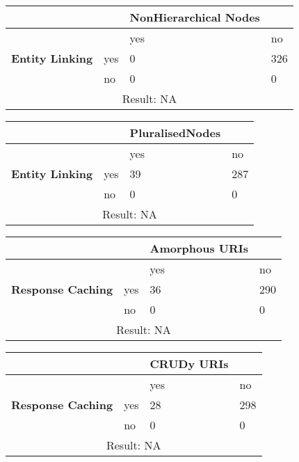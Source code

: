 \documentclass[a4paper,12pt]{article}
\begin{document}
\begin{center}
  \begin{tabular}{| p{60mm} | p{10mm} | p{35mm} | p{35mm} |}
  \hline
   & & \textbf{NonHierarchical Nodes} &
  \\
  \hline
  & & yes & no
  \\
  \hline
  \textbf{Entity Linking} & yes & 0 & 326
  \\
  \hline
   & no & 0 & 0
  \\
  \hline
  \multicolumn{4}{|c|}{Result: NA}
  \\ \hline
  \end{tabular}
  \end{center}

\begin{center}
  \begin{tabular}{| p{60mm} | p{10mm} | p{35mm} | p{35mm} |}
  \hline
   & & \textbf{PluralisedNodes} &
  \\
  \hline
  & & yes & no
  \\
  \hline
  \textbf{Entity Linking} & yes & 39 & 287
  \\
  \hline
   & no & 0 & 0
  \\
  \hline
  \multicolumn{4}{|c|}{Result: NA}
  \\ \hline
  \end{tabular}
  \end{center}

\begin{center}
  \begin{tabular}{| p{60mm} | p{10mm} | p{35mm} | p{35mm} |}
  \hline
   & & \textbf{Amorphous URIs} &
  \\
  \hline
  & & yes & no
  \\
  \hline
  \textbf{Response Caching} & yes & 36 & 290
  \\
  \hline
   & no & 0 & 0
  \\
  \hline
  \multicolumn{4}{|c|}{Result: NA}
  \\ \hline
  \end{tabular}
  \end{center}

\begin{center}
  \begin{tabular}{| p{60mm} | p{10mm} | p{35mm} | p{35mm} |}
  \hline
   & & \textbf{CRUDy URIs} &
  \\
  \hline
  & & yes & no
  \\
  \hline
  \textbf{Response Caching} & yes & 28 & 298
  \\
  \hline
   & no & 0 & 0
  \\
  \hline
  \multicolumn{4}{|c|}{Result: NA}
  \\ \hline
  \end{tabular}
  \end{center}
\end{document}
